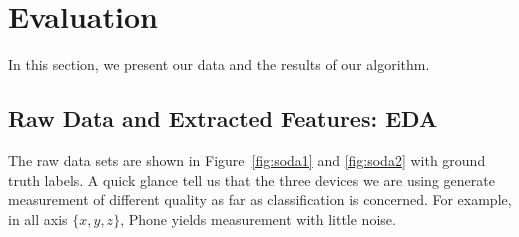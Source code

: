 
\section{Evaluation}
\label{sec:evaluation}

In this section, we present our data and the results of our algorithm.

\subsection{Raw Data and Extracted Features: EDA}
The raw data sets are shown in Figure~\ref{fig:soda1} and \ref{fig:soda2} with ground truth labels. A quick glance tell us that the three devices we are using generate measurement of different quality as far as classification is concerned. For example, in all axis $\{x,y,z\}$, Phone yields measurement with little noise. 

